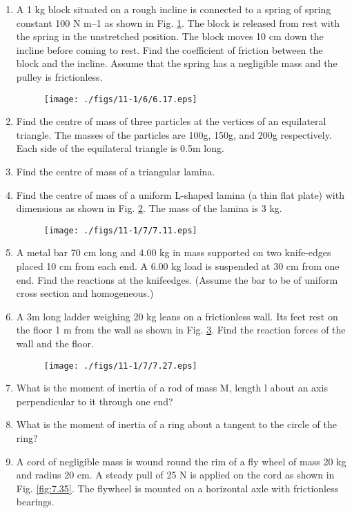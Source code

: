 \begin{enumerate}[label=\arabic*.,ref=\thesubsection.\theenumi]
\item  A 1 kg block situated on a rough incline is connected to a spring of spring constant 100 N m–1
as shown in Fig. \ref{fig:6.17}. The block is released from rest with the spring in the
unstretched position. The block moves 10 cm down the incline before coming to rest. Find the coefficient of friction between the block and the incline. Assume that the
spring has a negligible mass and the pulley is frictionless.
\begin{figure}[!ht]
\texttt{[image: ./figs/11-1/6/6.17.eps]}
\caption{}
\label{fig:6.17}
\end{figure}
\item Find the centre of mass of three particles at the vertices of an equilateral triangle. The masses of the particles are 100g, 150g, and 200g respectively. Each side of the equilateral triangle is 0.5m long.
\item Find the centre of mass of a triangular lamina.
\item Find the centre of mass of a uniform L-shaped lamina (a thin flat plate) with dimensions as shown in Fig. \ref{fig:7.11}. The mass of the lamina is 3 kg.
\begin{figure}[!ht]
\texttt{[image: ./figs/11-1/7/7.11.eps]}
\caption{}
\label{fig:7.11}
\end{figure}
\item A metal bar 70 cm long and 4.00 kg in mass supported on two knife-edges placed 10 cm from each end. A 6.00 kg load is suspended at 30 cm from one end. Find the reactions at the knifeedges. (Assume the bar to be of uniform cross section and homogeneous.)
\item A 3m long ladder weighing 20 kg leans on a frictionless wall. Its feet rest on the floor 1 m from the wall as shown in Fig. \ref{fig:7.27}. Find the reaction forces of the wall and the floor.
\begin{figure}[!ht]
\texttt{[image: ./figs/11-1/7/7.27.eps]}
\caption{}
\label{fig:7.27}
\end{figure}
\item What is the moment of inertia of a rod of mass M, length l about an axis perpendicular to it through one end?
\item What is the moment of inertia of a ring about a tangent to the circle of the ring?
\item  A cord of negligible mass is wound round the rim of a fly wheel of mass 20 kg and radius 20 cm. A steady pull of 25 N is applied on the cord as shown in Fig. \ref{fig:7.35}. The flywheel is mounted on a horizontal axle with frictionless bearings.

\end{enumerate}
